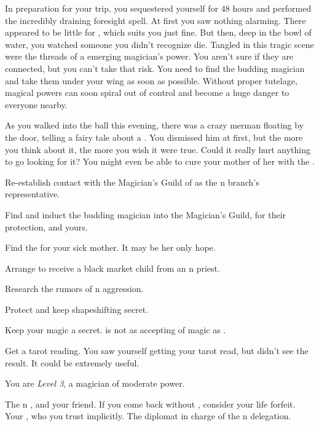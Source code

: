 \documentclass[char]{NeptuneBall}
\begin{document}
In preparation for your trip, you sequestered yourself for 48 hours and performed the incredibly draining foresight spell. At first you saw nothing alarming. There appeared to be little for \cPrince{}, which suits you just fine. But then, deep in the bowl of water, you watched someone you didn't recognize die. Tangled in this tragic scene were the threads of a emerging magician's power. You aren't sure if they are connected, but you can't take that risk. You need to find the budding magician and take them under your wing as soon as possible. Without proper tutelage, magical powers can soon spiral out of control and become a huge danger to everyone nearby.

As you walked into the ball this evening, there was a crazy merman floating by the door, telling a fairy tale about a \iWishingStone{\MYname}. You dismissed him at first, but the more you think about it, the more you wish it were true. Could it really hurt anything to go looking for it? You might even be able to cure your mother of her \ppolio{} with the \iWishingStone{\MYname}.

\begin{itemz}[Goals]
  \item Re-establish contact with the Magician's Guild of \pAtlantis{} as the \pPacifica{}n branch's representative.
  \item Find and induct the budding magician into the Magician's Guild, for their protection, and yours.
	\item Find the \iWishingStone{} for your sick mother. It may be her only hope.
  \item Arrange to receive a black market child from an \pAtlantis{}n priest.
  \item Research the rumors of \pIndia{}n aggression.
  \item Protect \cPrince{} and keep \cPrince{\their} shapeshifting secret.
	\item Keep your magic a secret. \pAtlantis{} is not as accepting of magic as \pPacifica{}.
	\item Get a tarot reading. You saw yourself getting your tarot read, but didn't see the result. It could be extremely useful.
\end{itemz}

\begin{itemz}[Notes]
	\item You are \emph{Level 3}, a magician of moderate power.
\end{itemz}

\begin{contacts}
  \contact{\cPrince{}} The \pPacifica{}n \cPrince{\Prince}, and your friend. If you come back without \cPrince{\them}, consider your life forfeit.
  \contact{\cSpy{}} Your \cSpy{\sibling}, who you trust implicitly.
  \contact{\cDiplomat{}} The diplomat in charge of the \pPacifica{}n delegation.
\end{contacts}
\end{document}
